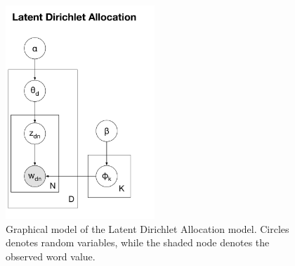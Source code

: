 \begin{figure}[tbh!]
\noindent \begin{centering}
\includegraphics[width=0.5\textwidth]{03-machine-learning/figures/lda.pdf}
\par\end{centering}
\caption[Graphical model of the Latent Dirichlet Allocation model.]{\label{fig:background-lda}Graphical model of the Latent Dirichlet Allocation model. Circles denotes random variables, while the shaded node denotes the observed word value.}
\end{figure}

